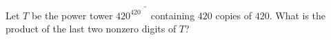 Let $T$ be the power tower $420^{420^{\cdot^{\cdot^{\cdot^{420}}}}}$ containing $420$ copies of $420$. What is the product of the last two nonzero digits of $T$?
